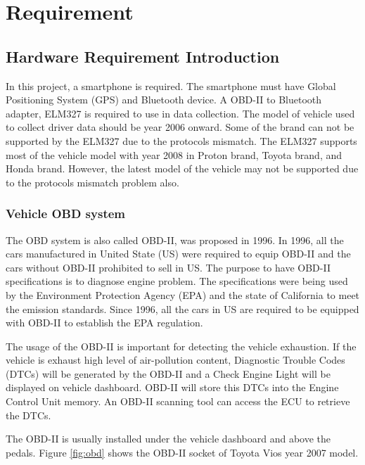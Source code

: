 \chapter{Requirement}
\section{Hardware Requirement Introduction}
In this project, a smartphone is required. The smartphone must have Global Positioning System (GPS) and Bluetooth device. A OBD-II to Bluetooth adapter, ELM327 is required to use in data collection. The model of vehicle used to collect driver data should be year 2006 onward. Some of the brand can not be supported by the ELM327 due to the protocols mismatch. The ELM327 supports most of the vehicle model with year 2008 in Proton brand, Toyota brand, and Honda brand. However, the latest model of the vehicle may not be supported due to the protocols mismatch problem also.

\subsection{Vehicle OBD system}
The OBD system is also called OBD-II, was proposed in 1996. In 1996, all the cars manufactured in United State (US) were required to equip OBD-II and the cars without OBD-II prohibited to sell in US. The purpose to have OBD-II specifications is to diagnose engine problem. The specifications were being used by the Environment Protection Agency (EPA) and the state of California to meet the emission standards. Since 1996, all the cars in US are required to be equipped with OBD-II to establish the EPA regulation. 

The usage of the OBD-II is important for detecting the vehicle exhaustion. If the vehicle is exhaust high level of air-pollution content, Diagnostic Trouble Codes (DTCs) will be generated by the OBD-II and a Check Engine Light will be displayed on vehicle dashboard. OBD-II will store this DTCs into the  Engine Control Unit memory. An OBD-II scanning tool can access the ECU to retrieve the DTCs.

The OBD-II is usually installed under the vehicle dashboard and above the pedals. Figure \ref{fig:obd} shows the OBD-II socket of Toyota Vios year 2007 model.

